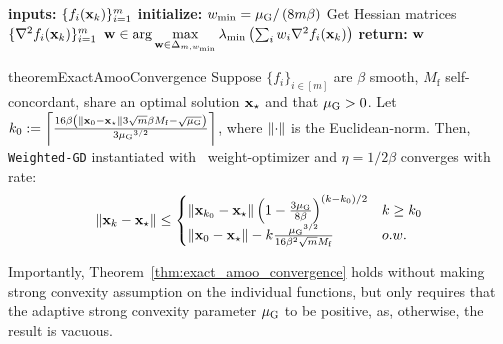 \begin{algorithm}[t]
\caption{\CAMOO}\label{alg:AMOOO} 
\begin{algorithmic}
  \STATE \textbf{inputs:} $\{ f_i({\mathbf{x}}_k) \}_{i=1}^m$ 
  \vspace{0.4mm}
  \STATE \textbf{initialize:} $w_{\min}={\mu_{\mathrm{G}}}/\left(8m\beta\right)$ 
  \vspace{0.4mm}
  \STATE Get Hessian matrices $\{ \nabla^2 f_i({\mathbf{x}}_k) \}_{i=1}^m$ 
  \vspace{0.4mm}
  \STATE ${\mathbf{w}}\in \arg\max\limits_{{\mathbf{w}}\in \Delta_{m,w_{\min}}} \lambda_{\min} \left(\sum_{i} w_i \nabla^2 f_i({\mathbf{x}}_{k})\right)$
  \vspace{0.4mm}
  \STATE \textbf{return:} ${\mathbf{w}}$
\end{algorithmic}
\end{algorithm}

\begin{restatable}{theorem}{ExactAmooConvergence}
\label{thm:exact_amoo_convergence}
        Suppose $\{f_i\}_{i\in [m]}$ are $\beta$ smooth, $M_{\mathrm{f}}$ self-concordant, share an optimal solution ${\mathbf{x}}_\star$ and that ${\mu_{\mathrm{G}}} > 0$. Let  $k_0 := \left\lceil \frac{16 \beta  \left(\left\Vert{\mathbf{x}}_0 - {\mathbf{x}}_\star\right\Vert 3\sqrt{m}\beta M_{\mathrm{f}} -\sqrt{{\mu_{\mathrm{G}}}}\right) }{ 3{\mu_{\mathrm{G}}}^{3/2}}\right\rceil$, where $\left\Vert\cdot\right\Vert$ is the Euclidean-norm. Then, \texttt{Weighted-GD} instantiated with \CAMOO\ weight-optimizer and $\eta = 1/2\beta$ converges with rate:
    \begin{align*}
        \left\Vert{\mathbf{x}}_{k} - {\mathbf{x}}_\star\right\Vert \leq 
        \begin{cases}
            \left\Vert{\mathbf{x}}_{k_0} - {\mathbf{x}}_\star\right\Vert \left(1-\frac{3{\mu_{\mathrm{G}}}}{8\beta}\right)^{(k-k_0)/2}  & k\geq k_0\\
            \left\Vert{\mathbf{x}}_0 - {\mathbf{x}}_\star\right\Vert- k \frac{{\mu_{\mathrm{G}}}^{3/2}}{16 \beta^2 \sqrt{m} M_{\mathrm{f}}} & o.w.
        \end{cases}
    \end{align*}
\end{restatable}
Importantly,  Theorem~\ref{thm:exact_amoo_convergence} holds without making strong convexity assumption on the individual functions, but only requires that the adaptive strong convexity parameter ${\mu_{\mathrm{G}}}$ to be positive, as, otherwise, the result is vacuous.

